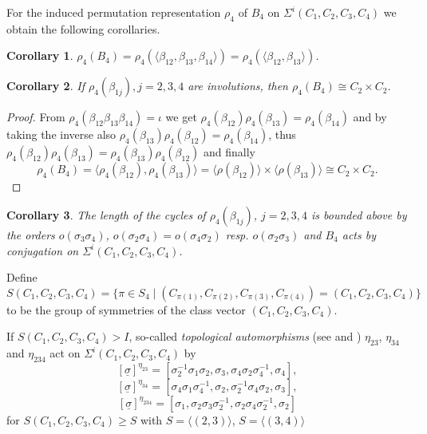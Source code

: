 \documentclass[12pt,a4paper]{article}
\newtheorem{corollary}{Corollary}[section]
\numberwithin{equation}{section}
\numberwithin{table}{section}
\begin{document}
%
\noindent
For the induced permutation representation $\rho_4$ of $B_4$ on $\Sigma^i(C_1,C_2,C_3,C_4)$ we obtain the following corollaries.
%
\begin{corollary}
\label{ActionOfPureHurwitzGroupByBeta1jCase4}
$\rho_4(B_4) = \rho_4(\langle \beta_{12}, \beta_{13}, \beta_{14} \rangle) = \rho_4(\langle \beta_{12}, \beta_{13} \rangle)$.
\end{corollary}
%
\begin{corollary}
\label{PropertiesOfPermutationRepresentationsCase4}
If $\rho_4(\beta_{1j}), j = 2,3,4$ are involutions, then $\rho_4(B_4) \cong C_2 \times C_2$.
\end{corollary}
\begin{proof}
From $\rho_4(\beta_{12} \beta_{13} \beta_{14}) = \iota$ we get
$\rho_4(\beta_{12}) \rho_4(\beta_{13}) = \rho_4(\beta_{14})$ and by taking the inverse also
$\rho_4(\beta_{13}) \rho_4(\beta_{12}) = \rho_4(\beta_{14})$,
thus $\rho_4(\beta_{12}) \rho_4(\beta_{13}) = \rho_4(\beta_{13}) \rho_4(\beta_{12})$ and finally
$$\rho_4(B_4) = \langle \rho_4(\beta_{12}), \rho_4(\beta_{13}) \rangle =
\langle \rho(\beta_{12}) \rangle \times \langle \rho(\beta_{13}) \rangle \cong C_2 \times C_2.$$
\end{proof}
%
\begin{corollary}
\label{ActionOfPureHurwitzGroupByConjugation}
The length of the cycles of $\rho_4(\beta_{1j})$,
$j=2,3,4$ is bounded above by the orders $o(\sigma_3 \sigma_4)$, $o(\sigma_2 \sigma_4)=o(\sigma_4 \sigma_2)$
resp. $o(\sigma_2 \sigma_3)$ and $B_4$ acts by conjugation on $\Sigma^i(C_1,C_2,C_3,C_4)$.
\end{corollary}
\noindent
Define $$S(C_1,C_2,C_3,C_4) = \{\pi \in S_4 \mid (C_{\pi(1)},C_{\pi(2)},C_{\pi(3)},C_{\pi(4)}) = (C_1,C_2,C_3,C_4) \}$$
to be the group of symmetries of the class vector $(C_1,C_2,C_3,C_4)$.
\par
\noindent
If $S(C_1,C_2,C_3,C_4) > I$, so-called {\it topological automorphisms} 
(see \cite[5.]{RefMat1989} and \cite[1.]{RefHae1991})
$\eta_{23}$, $\eta_{34}$ and $\eta_{234}$ act on
$\Sigma^i(C_1,C_2,C_3,C_4)$ by
$$[\underline{\sigma}]^{\eta_{23}} = 
[\sigma_2^{-1} \sigma_1 \sigma_2,\sigma_3,\sigma_4 \sigma_2 \sigma_4^{-1},\sigma_4],$$
$$[\underline{\sigma}]^{\eta_{34}} = 
[\sigma_4 \sigma_1 \sigma_4^{-1},\sigma_2,\sigma_2^{-1} \sigma_4 \sigma_2,\sigma_3],$$
$$[\underline{\sigma}]^{\eta_{234}} = 
[\sigma_1,\sigma_2 \sigma_3 \sigma_2^{-1}, \sigma_2 \sigma_4 \sigma_2^{-1},\sigma_2]$$
for $S(C_1,C_2,C_3,C_4) \geq S$ with $S = \langle (2,3) \rangle$, $S = \langle (3,4) \rangle$
\end{document}

